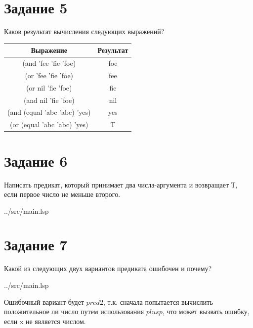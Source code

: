 \section*{Задание 5}
Каков результат вычисления следующих выражений?

\begin{table}[ht]
	\begin{center}
		\begin{tabular}{|c|c|}
			\hline
			\textbf{Выражение} & \textbf{Результат} \\
			\hline
			(and 'fee 'fie 'foe)  & foe \\
			\hline
			(or 'fee 'fie 'foe) & fee \\
			\hline
			(or nil 'fie 'foe)  & fie \\
			\hline
			(and nil 'fie 'foe) & nil \\
			\hline
			(and (equal 'abc 'abc) 'yes) & yes \\
			\hline
			(or (equal 'abc 'abc) 'yes) & T \\
			\hline
		\end{tabular}
	\end{center}
\end{table}

\section*{Задание 6}

Написать предикат, который принимает два числа-аргумента и возвращает Т, если первое число не меньше второго.

\begin{lstinputlisting}[
	caption={Задание 6},
	label={lst:t6},
	linerange={79-81},
	]{../src/main.lsp}
\end{lstinputlisting}

\section*{Задание 7}

Какой из следующих двух вариантов предиката ошибочен и почему?

\begin{lstinputlisting}[
	caption={Задание 7},
	label={lst:t7},
	linerange={93-99},
	]{../src/main.lsp}
\end{lstinputlisting}

Ошибочный вариант будет $pred2$, т.к. сначала попытается вычислить положительное ли число путем использования $plusp$, что может вызвать ошибку, если x не является числом.


